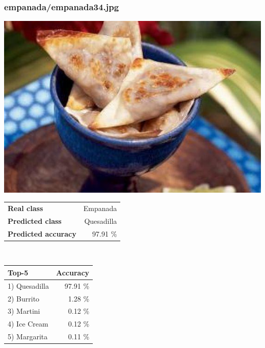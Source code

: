 \subsubsection{empanada/empanada34.jpg}

\begin{minipage}[t]{0.4\textwidth}
	\vspace{0pt}
	\includegraphics[width=\linewidth]{images/evaluation-images/empanada/empanada34.jpg}
\end{minipage}
\hfill
\begin{minipage}[t]{0.5\textwidth}
	\vspace{0pt}\raggedright
	\begin{tabularx}{\textwidth}{X r}
		\small \textbf{Real class} & \small Empanada\\
		\small \textbf{Predicted class} & \small Quesadilla\\
		\small \textbf{Predicted accuracy} & \small 97.91 \%
    \end{tabularx}\\
    
    \vspace{6pt}
	\begin{tabularx}{\textwidth}{X r}
        \small \textbf{Top-5} & \small \textbf{Accuracy} \\
        \hline
		\small 1) Quesadilla & \small 97.91 \%\\\small 2) Burrito & \small 1.28 \%\\\small 3) Martini & \small 0.12 \%\\\small 4) Ice Cream & \small 0.12 \%\\\small 5) Margarita & \small 0.11 \%
    \end{tabularx}
\end{minipage}
    
